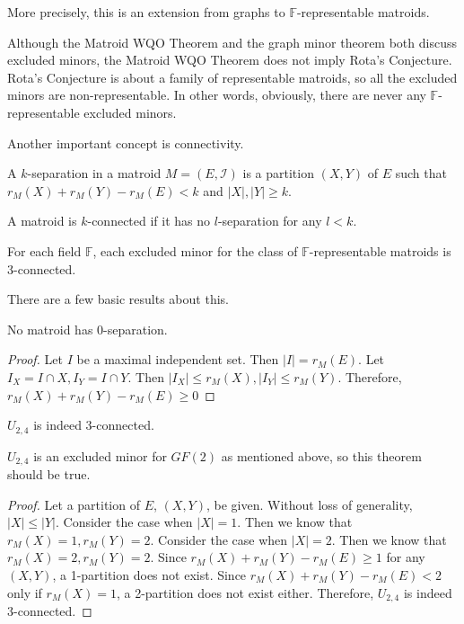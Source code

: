 More precisely, this is an extension from graphs to $\mathbb{F}$-representable matroids.

Although the Matroid WQO Theorem and the graph minor theorem both discuss excluded minors, the Matroid WQO Theorem does not imply Rota's Conjecture.
Rota's Conjecture is about a family of representable matroids, so all the excluded minors are non-representable.
In other words, obviously, there are never any $\mathbb{F}$-representable excluded minors.

%

Another important concept is connectivity.
\begin{defn}
A $k$-separation in a matroid $M = (E, \mathcal{I})$ is a partition $(X, Y)$ of $E$ such that $r_M(X) + r_M(Y) - r_M(E) < k$ and $\lvert X \rvert, \lvert Y \rvert \geq k$.
\end{defn}
\begin{defn}
A matroid is $k$-connected if it has no $l$-separation for any $l < k$.
\end{defn}

\begin{lem}
For each field $\mathbb{F}$, each excluded minor for the class of $\mathbb{F}$-representable matroids is 3-connected.
\end{lem}


There are a few basic results about this.

\begin{thm}
No matroid has 0-separation.
\end{thm}
\begin{proof}
Let $I$ be a maximal independent set.
Then $\lvert I \rvert = r_M(E)$.
Let $I_X = I \cap X, I_Y = I \cap Y$.
Then $\lvert I_X \rvert \leq r_M(X), \lvert I_Y \rvert \leq r_M(Y)$.
Therefore, $r_M(X) + r_M(Y) - r_M(E) \geq 0$
\end{proof}


\begin{thm}
$U_{2, 4}$ is indeed 3-connected.
\end{thm}
$U_{2, 4}$ is an excluded minor for $GF(2)$ as mentioned above, so this theorem should be true.
\begin{proof}
Let a partition of $E$, $(X, Y)$, be given.
Without loss of generality, $\lvert X \rvert \leq \lvert Y \rvert$.
Consider the case when $\lvert X \rvert = 1$.
Then we know that $r_M(X) = 1, r_M(Y) = 2$.
Consider the case when $\lvert X \rvert = 2$.
Then we know that $r_M(X) = 2, r_M(Y) = 2$.
Since $r_M(X) + r_M(Y) - r_M(E) \geq 1$ for any $(X, Y)$, a 1-partition does not exist.
Since $r_M(X) + r_M(Y) - r_M(E) < 2$ only if $r_M(X) = 1$, a 2-partition does not exist either.
Therefore, $U_{2, 4}$ is indeed 3-connected.
\end{proof}

